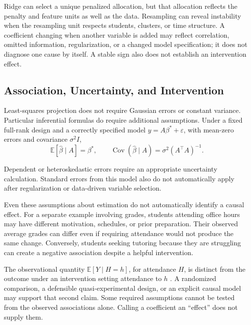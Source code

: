 Ridge can select a unique penalized allocation, but that allocation reflects the penalty and feature units as well as the data. Resampling can reveal instability when the resampling unit respects students, clusters, or time structure. A coefficient changing when another variable is added may reflect correlation, omitted information, regularization, or a changed model specification; it does not diagnose one cause by itself. A stable sign also does not establish an intervention effect.

\par\medskip\noindent\begin{minipage}{\linewidth}
\subsection{Association, Uncertainty, and Intervention}

Least-squares projection does not require Gaussian errors or constant variance. Particular inferential formulas do require additional assumptions. Under a fixed full-rank design and a correctly specified model $y=A\beta^*+\varepsilon$, with mean-zero errors and covariance $\sigma^2I$,
\[
\mathbb E[\hat\beta\mid A]=\beta^*,
\qquad
\operatorname{Cov}(\hat\beta\mid A)=\sigma^2(A^\top A)^{-1}.
\]
\end{minipage}\par
Dependent or heteroskedastic errors require an appropriate uncertainty calculation. Standard errors from this model also do not automatically apply after regularization or data-driven variable selection.

Even these assumptions about estimation do not automatically identify a causal effect. For a separate example involving grades, students attending office hours may have different motivation, schedules, or prior preparation. Their observed average grades can differ even if requiring attendance would not produce the same change. Conversely, students seeking tutoring because they are struggling can create a negative association despite a helpful intervention.

The observational quantity $\mathbb E[Y\mid H=h]$, for attendance $H$, is distinct from the outcome under an intervention setting attendance to $h$ \citep{pearl2009}. A randomized comparison, a defensible quasi-experimental design, or an explicit causal model may support that second claim. Some required assumptions cannot be tested from the observed associations alone. Calling a coefficient an ``effect'' does not supply them.

